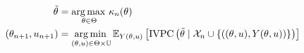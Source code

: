 \documentclass[../../Main_ManuscritThese.tex]{subfiles}
\begin{document}
\begin{align}
  \tilde{\theta} &= \operatorname*{arg\,max \,}_{\theta\in \Theta} \kappa_n(\theta) \label{eq:acq_candidate_IVPC}\\
  (\theta_{n+1}, u_{n+1}) & = \operatorname*{arg\,min \,}_{(\theta,u) \in \Theta \times \mathbb{U}} \mathbb{E}_{Y(\theta, u)}\left[ \mathrm{IVPC}\left(\tilde{\theta} \mid \mathcal{X}_n \cup\left\{\left((\theta,u), Y(\theta, u)\right)\right\} \right)  \right]
\end{align}


%   

%   
\end{document}
